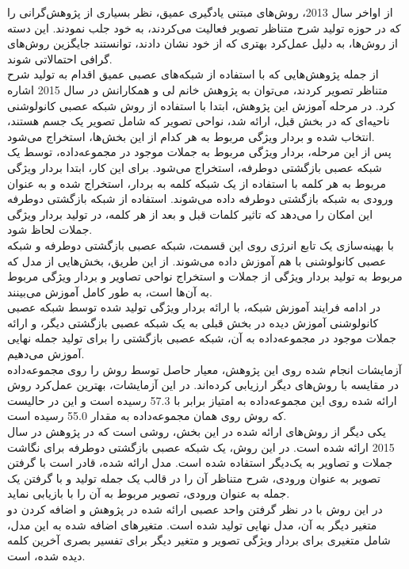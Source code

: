 از اواخر سال 2013، روش‌های مبتنی یادگیری عمیق، نظر بسیاری از پژوهش‌گرانی را که در حوزه تولید شرح متناظر تصویر فعالیت می‌کردند، به خود جلب نمودند. این دسته‌ از روش‌ها، به دلیل عمل‌کرد بهتری که از خود نشان دادند، توانستند جایگزین روش‌های گرافی احتمالاتی شوند. 
\\
از جمله پژوهش‌هایی که با استفاده از شبکه‌های عصبی عمیق اقدام به تولید شرح متناظر تصویر کردند، می‌توان به پژوهش خانم لی و همکارانش \cite{karpathy2015deep} در سال 2015  اشاره کرد. در مرحله آموزش این پژوهش، ابتدا با استفاده از روش شبکه عصبی کانولوشنی ناحیه‌ای که در بخش قبل، ارائه شد، نواحی تصویر که شامل تصویر یک جسم هستند، انتخاب شده و بردار ویژگی مربوط به هر کدام از این بخش‌ها، استخراج می‌شود.
\\
پس از این مرحله، بردار ویژگی مربوط به جملات موجود در مجموعه‌داده، توسط یک شبکه عصبی بازگشتی دوطرفه، استخراج می‌شود. برای این‌ کار، ابتدا بردار ویژگی مربوط به هر کلمه با استفاده از یک شبکه کلمه به بردار، استخراج شده و به عنوان ورودی به شبکه بازگشتی دوطرفه داده می‌شوند. استفاده از شبکه بازگشتی دوطرفه این امکان را می‌دهد که تاثیر کلمات قبل و بعد از هر کلمه، در تولید بردار ویژگی جملات لحاظ شود.
\\
با بهینه‌سازی یک تابع انرژی روی این قسمت، شبکه عصبی بازگشتی دوطرفه و شبکه عصبی کانولوشنی با هم آموزش داده می‌شوند. از این طریق، بخش‌هایی از مدل که مربوط به تولید بردار ویژگی از جملات و استخراج نواحی تصاویر و بردار ویژگی مربوط به آن‌ها است، به طور کامل آموزش می‌بینند.
\\
در ادامه فرایند آموزش شبکه، با ارائه بردار ویژگی تولید شده توسط شبکه عصبی کانولوشنی آموزش دیده در بخش قبلی به یک شبکه عصبی بازگشتی دیگر، و ارائه جملات موجود در مجموعه‌داده به آن، شبکه عصبی بازگشتی را برای تولید جمله نهایی آموزش می‌دهیم.
\\
آزمایشات انجام شده روی این پژوهش، معیار  حاصل توسط روش را روی مجموعه‌داده  در مقایسه با روش‌های دیگر ارزیابی کرده‌اند. در این آزمایشات، بهترین عمل‌کرد روش ارائه شده روی این مجموعه‌داده به امتیاز  برابر با 57.3 رسیده است و این در حالیست که روش \cite{mao2014explain} روی همان مجموعه‌داده به مقدار 55.0 رسیده است.
\\
یکی دیگر از روش‌های ارائه شده در این بخش، روشی است که در پژوهش \cite{chen2015mind} در سال 2015 ارائه شده است. در این روش، یک شبکه عصبی بازگشتی دوطرفه برای نگاشت جملات و تصاویر به یک‌دیگر استفاده شده است. مدل ارائه شده، قادر است با گرفتن تصویر به عنوان ورودی، شرح متناظر آن را در قالب یک جمله تولید و با گرفتن یک جمله به عنوان ورودی، تصویر مربوط به آن را با بازیابی نماید.
\\
در این روش با در نظر گرفتن واحد عصبی ارائه شده در پژوهش \cite{mikolov2010recurrent} و اضافه کردن دو متغیر دیگر به آن، مدل نهایی تولید شده است. متغیرهای اضافه شده به این مدل، شامل متغیری برای  بردار ویژگی تصویر و متغیر دیگر برای تفسیر بصری آخرین کلمه دیده شده، است.
